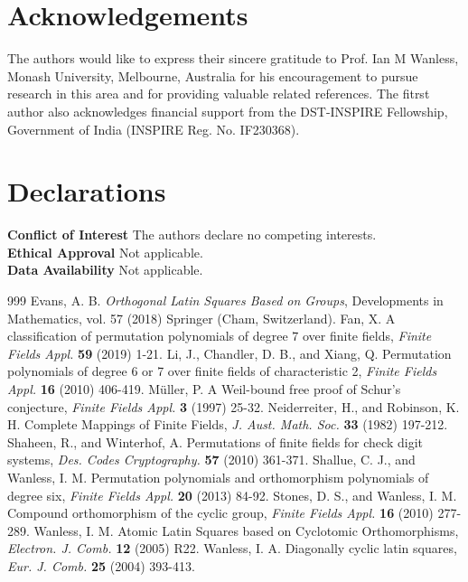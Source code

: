 \documentclass[12pt,a4wide, reqno]{amsart}
\theoremstyle{definition}
\theoremstyle{remark}
\numberwithin{equation}{section}
\begin{document}
\section{Acknowledgements}
The authors would like to express their sincere gratitude to Prof. Ian  M 
Wanless, Monash University, Melbourne, Australia for his encouragement to pursue research in this area and for providing valuable related references. The fitrst author also acknowledges financial support from the DST-INSPIRE Fellowship, Government of  India (INSPIRE Reg. No. IF230368).
\section{Declarations}
\noindent
\textbf{Conflict of Interest} The authors declare no competing interests.\\
\textbf{Ethical Approval} Not applicable.\\
\textbf{Data Availability} Not applicable.
\begin{thebibliography}{999}
Evans, A. B. \emph{Orthogonal Latin Squares Based on Groups}, Developments in Mathematics, vol. 57 (2018) Springer (Cham, Switzerland).
 Fan, X. A classification of permutation polynomials of degree $7$ over finite fields, \emph{Finite Fields Appl.} \textbf{59} (2019) 1-21.
 Li, J., Chandler, D. B., and Xiang, Q. Permutation polynomials of degree 6 or 7 over finite fields of characteristic 2, \emph{Finite Fields Appl.} \textbf{16} (2010) 406-419.
M\"{u}ller, P. A Weil-bound free proof of Schur's conjecture, \emph{Finite Fields Appl.} \textbf{3} (1997) 25-32.
Neiderreiter, H., and Robinson, K. H. Complete Mappings of Finite Fields, \emph{J. Aust. Math. Soc.} \textbf{33} (1982) 197-212.
Shaheen, R., and Winterhof, A. Permutations of finite fields for check digit systems, \emph{Des. Codes Cryptography.} \textbf{57} (2010) 361-371.
Shallue, C. J., and  Wanless, I. M. Permutation polynomials and orthomorphism polynomials of degree six, \emph{Finite Fields Appl.} \textbf{20} (2013) 84-92.
Stones, D. S., and  Wanless, I. M. Compound orthomorphism of the cyclic group, \emph{Finite Fields Appl.} \textbf{16} (2010) 277-289.
Wanless, I. M. Atomic Latin Squares based on Cyclotomic Orthomorphisms, \emph{Electron. J. Comb.} \textbf{12} (2005) R22.
Wanless, I. A. Diagonally cyclic latin squares, \emph{Eur. J. Comb.} \textbf{25} (2004) 393-413.
\end{thebibliography}
\end{document}
